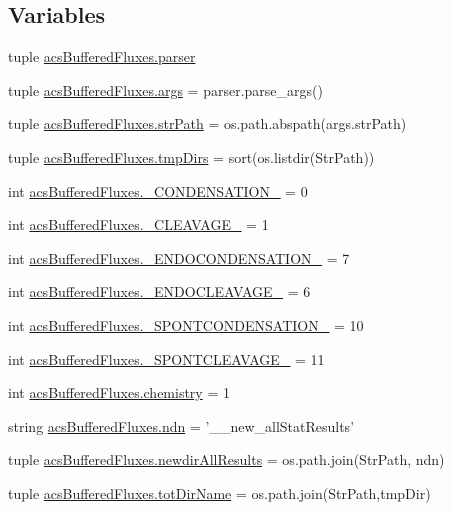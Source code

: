\subsection*{Variables}
\begin{DoxyCompactItemize}
\item 
tuple \hyperlink{a00092_adba84e3872cb47cad219837458e56677}{acs\-Buffered\-Fluxes.\-parser}
\item 
tuple \hyperlink{a00092_afa2d0b9fb021746e05cd06277997da04}{acs\-Buffered\-Fluxes.\-args} = parser.\-parse\-\_\-args()
\item 
tuple \hyperlink{a00092_a8932cabcf73065a531104c53a324508a}{acs\-Buffered\-Fluxes.\-str\-Path} = os.\-path.\-abspath(args.\-str\-Path)
\item 
tuple \hyperlink{a00092_af740eb0100dc7010628161baeaf9b474}{acs\-Buffered\-Fluxes.\-tmp\-Dirs} = sort(os.\-listdir(Str\-Path))
\item 
int \hyperlink{a00092_aad87b9d241bea71df95c318686aca066}{acs\-Buffered\-Fluxes.\-\_\-\-C\-O\-N\-D\-E\-N\-S\-A\-T\-I\-O\-N\-\_\-} = 0
\item 
int \hyperlink{a00092_af81d6d0377f4d99177961a5604f58ed2}{acs\-Buffered\-Fluxes.\-\_\-\-C\-L\-E\-A\-V\-A\-G\-E\-\_\-} = 1
\item 
int \hyperlink{a00092_a0637697acae236afe5e5ae8dc1d85431}{acs\-Buffered\-Fluxes.\-\_\-\-E\-N\-D\-O\-C\-O\-N\-D\-E\-N\-S\-A\-T\-I\-O\-N\-\_\-} = 7
\item 
int \hyperlink{a00092_a4535f1f4043aef3195766733626b61e4}{acs\-Buffered\-Fluxes.\-\_\-\-E\-N\-D\-O\-C\-L\-E\-A\-V\-A\-G\-E\-\_\-} = 6
\item 
int \hyperlink{a00092_a33ff8ddc4a26ccd45029e2b369391aba}{acs\-Buffered\-Fluxes.\-\_\-\-S\-P\-O\-N\-T\-C\-O\-N\-D\-E\-N\-S\-A\-T\-I\-O\-N\-\_\-} = 10
\item 
int \hyperlink{a00092_a485cf1077a4ece847800617ede00e458}{acs\-Buffered\-Fluxes.\-\_\-\-S\-P\-O\-N\-T\-C\-L\-E\-A\-V\-A\-G\-E\-\_\-} = 11
\item 
int \hyperlink{a00092_ab4fd705796fd835a4238fecdc3caf76e}{acs\-Buffered\-Fluxes.\-chemistry} = 1
\item 
string \hyperlink{a00092_a5df7e71a36351afd3e59d6f50a94bdaf}{acs\-Buffered\-Fluxes.\-ndn} = '\-\_\-\_\-new\-\_\-all\-Stat\-Results'
\item 
tuple \hyperlink{a00092_ae53bd92b0509a8f35e92e734a7f4b4e1}{acs\-Buffered\-Fluxes.\-newdir\-All\-Results} = os.\-path.\-join(Str\-Path, ndn)
\item 
tuple \hyperlink{a00092_a7883e37b9556e49968e7a7dd08893bfb}{acs\-Buffered\-Fluxes.\-tot\-Dir\-Name} = os.\-path.\-join(Str\-Path,tmp\-Dir)

\end{DoxyCompactItemize}
